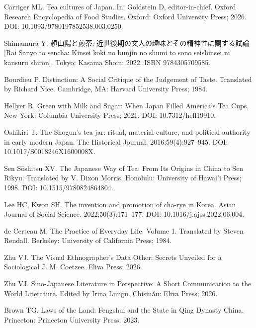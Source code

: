 \documentclass[11pt,a4paper]{article}
\newenvironment{refs}{%
  \begin{list}{}{%
    \setlength{\leftmargin}{1.6em}
    \setlength{\itemindent}{-1.6em}
    \setlength{\itemsep}{0.6em}
    \setlength{\parsep}{0pt}
  }
}{\end{list}}
\newcommand{\refitem}[2]{\item[] [#1] #2}
\begin{document}
\begin{refs}
\refitem{11}{Carriger ML. Tea cultures of Japan. In: Goldstein D, editor-in-chief. Oxford Research Encyclopedia of Food Studies. Oxford: Oxford University Press; 2026. DOI: 10.1093/9780197852538.003.0250.}

\refitem{12}{Shimamura Y. 頼山陽と煎茶: 近世後期の文人の趣味とその精神性に関する試論 [Rai Sanyō to sencha: Kinsei kōki no bunjin no shumi to sono seishinsei ni kansuru shiron]. Tokyo: Kasama Shoin; 2022. ISBN 9784305709585.}

\refitem{13}{Bourdieu P. Distinction: A Social Critique of the Judgement of Taste. Translated by Richard Nice. Cambridge, MA: Harvard University Press; 1984.}

\refitem{14}{Hellyer R. Green with Milk and Sugar: When Japan Filled America's Tea Cups. New York: Columbia University Press; 2021. DOI: 10.7312/hell19910.}

\refitem{15}{Oshikiri T. The Shogun's tea jar: ritual, material culture, and political authority in early modern Japan. The Historical Journal. 2016;59(4):927--945. DOI: 10.1017/S0018246X1600008X.}

\refitem{16}{Sen Sōshitsu XV. The Japanese Way of Tea: From Its Origins in China to Sen Rikyu. Translated by V. Dixon Morris. Honolulu: University of Hawai'i Press; 1998. DOI: 10.1515/9780824864804.}

\refitem{17}{Lee HC, Kwon SH. The invention and promotion of cha-rye in Korea. Asian Journal of Social Science. 2022;50(3):171--177. DOI: 10.1016/j.ajss.2022.06.004.}

\refitem{18}{de Certeau M. The Practice of Everyday Life. Volume 1. Translated by Steven Rendall. Berkeley: University of California Press; 1984.}

\refitem{19}{Zhu VJ. The Visual Ethnographer's Data Other: Secrets Unveiled for a Sociological J. M. Coetzee. Eliva Press; 2026.}

\refitem{20}{Zhu VJ. Sino-Japanese Literature in Perspective: A Short Communication to the World Literature. Edited by Irina Lungu. Chișinău: Eliva Press; 2026.}

\refitem{21}{Brown TG. Laws of the Land: Fengshui and the State in Qing Dynasty China. Princeton: Princeton University Press; 2023.}
\end{refs}
\end{document}
